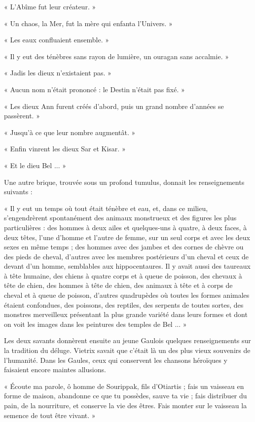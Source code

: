 \documentclass[a4paper, 11pt, oneside, polutonikogreek, french]{article}
\begin{document}
« L'Abîme fut leur créateur. »

« Un chaos, la Mer, fut la mère qui enfanta l'Univers. »

« Les eaux confluaient ensemble. »

« Il y eut des ténèbres sans rayon de lumière, un ouragan sans accalmie. »

« Jadis les dieux n'existaient pas. »

« Aucun nom n'était prononcé : le Destin n'était pas fixé. »

« Les dieux Ann furent créés d'abord, puis un grand nombre d'années se passèrent. »

« Jusqu'à ce que leur nombre augmentât. »

« Enfin vinrent les dieux Sar et Kisar. »

« Et le dieu Bel ... »

Une autre brique, trouvée sous un profond tumulus, donnait les renseignements suivants :

« Il y eut un temps où tout était ténèbre et eau, et, dans ce milieu, s'engendrèrent spontanément des animaux monstrueux et des figures les plus particulières : des hommes à deux ailes et quelques-uns à quatre, à deux faces, à deux têtes, l'une d'homme et l'autre de femme, sur un seul corps et avec les deux sexes en même temps ; des hommes avec des jambes et des cornes de chèvre ou des pieds de cheval, d'autres avec les membres postérieurs d'un cheval et ceux de devant d'un homme, semblables aux hippocentaures. Il y avait aussi des taureaux à tête humaine, des chiens à quatre corps et à queue de poisson, des chevaux à tête de chien, des hommes à tête de chien, des animaux à tête et à corps de cheval et à queue de poisson, d'autres quadrupèdes où toutes les formes animales étaient confondues, des poissons, des reptiles, des serpents de toutes sortes, des monstres merveilleux présentant la plus grande variété dans leurs formes et dont on voit les images dans les peintures des temples de Bel ... »

\bigskip
\centerline{\EightStarTaper}
\centerline{\EightStarTaper\EightStarTaper}
\bigskip

Les deux savants donnèrent ensuite au jeune Gaulois quelques renseignements sur la tradition du déluge. Vietrix savait que c'était là un des plus vieux souvenirs de l'humanité. Dans les Gaules, ceux qui conservent les chansons héroïques y faisaient encore maintes allusions.

« Écoute ma parole, ô homme de Sourippak, fils d'Otiartis ; fais un vaisseau en forme de maison, abandonne ce que tu possèdes, sauve ta vie ; fais distribuer du pain, de la nourriture, et conserve la vie des êtres. Fais monter sur le vaisseau la semence de tout être vivant. »
\end{document}
